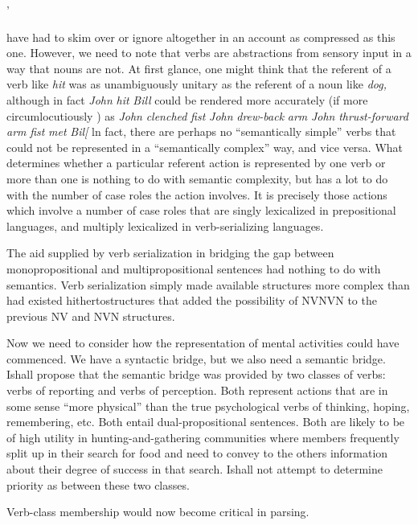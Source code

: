'


have had to skim over or ignore altogether in an account as compressed as this one. However, we need to note that verbs are abstractions from sensory input in a way that nouns are not. At first glance, one might think that the referent of a verb like \textit{hit} was as unambiguously unitary as the referent of a noun like \textit{dog,} although in fact \textit{John} \textit{hit} \textit{Bill} could be rendered more accurately (if more circumlocutiously ) as \textit{John} \textit{clenched} \textit{fist} \textit{John} \textit{drew-back} \textit{a}\textit{r}\textit{m} \textit{John} \textit{thrust}\textit{{}-}\textit{forward} \textit{arm} \textit{fist} \textit{met} \textit{Bil[} ln fact, there are perhaps no ``semantically simple'' verbs that could not be represented in a ``semantically complex'' way, and vice versa. What determines whether a particular referent action is repre\-sented by one verb or more than one is nothing to do with semantic complexity, but has a lot to do with the number of case roles the action involves. It is precisely those actions which involve a number of case roles that are singly lexicalized in prepositional languages, and multiply lexicalized in verb-serializing languages.

The aid supplied by verb serialization in bridging the gap between monopropositional and multipropositional sentences had nothing to do with semantics. Verb serialization simply made available structures more complex than had existed hithertostructures that added the possibility of NVNVN to the previous NV and NVN structures.

Now we need to consider how the representation of mental activities could have commenced. We have a syntactic bridge, but we also need a semantic bridge. Ishall propose that the semantic bridge was provided by two classes of verbs: verbs of reporting and verbs of perception. Both represent actions that are in some sense ``more phy\-sical'' than the true psychological verbs of thinking, hoping, remem\-bering, etc. Both entail dual-propositional sentences. Both are likely to be of high utility in hunting-and-gathering communities where members frequently split up in their search for food and need to con\-vey to the others information about their degree of success in that search. Ishall not attempt to determine priority as between these two classes.

Verb-class membership would now become critical in parsing.

